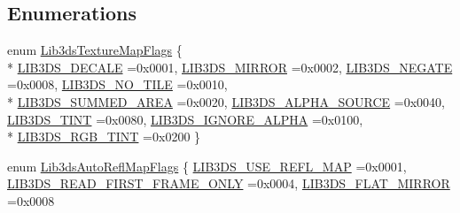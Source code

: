 \subsection*{Enumerations}
\begin{DoxyCompactItemize}
\item 
enum \hyperlink{group__material_ga2ae5527c7d5eab53e2cd3e1357021f96}{Lib3ds\-Texture\-Map\-Flags} \{ \\*
\hyperlink{group__material_gga2ae5527c7d5eab53e2cd3e1357021f96a34a68a6bc340962a8e37c5f0b6e3a678}{L\-I\-B3\-D\-S\-\_\-\-D\-E\-C\-A\-L\-E} =0x0001, 
\hyperlink{group__material_gga2ae5527c7d5eab53e2cd3e1357021f96a95634a83e61bac859c041b52d1adcd5f}{L\-I\-B3\-D\-S\-\_\-\-M\-I\-R\-R\-O\-R} =0x0002, 
\hyperlink{group__material_gga2ae5527c7d5eab53e2cd3e1357021f96a02d890c573757bef78e51058e8e54600}{L\-I\-B3\-D\-S\-\_\-\-N\-E\-G\-A\-T\-E} =0x0008, 
\hyperlink{group__material_gga2ae5527c7d5eab53e2cd3e1357021f96a0b6e8e950541f25cd3f195e963c7b3fe}{L\-I\-B3\-D\-S\-\_\-\-N\-O\-\_\-\-T\-I\-L\-E} =0x0010, 
\\*
\hyperlink{group__material_gga2ae5527c7d5eab53e2cd3e1357021f96a6e968f83117a98e10efeeaad12b14ff1}{L\-I\-B3\-D\-S\-\_\-\-S\-U\-M\-M\-E\-D\-\_\-\-A\-R\-E\-A} =0x0020, 
\hyperlink{group__material_gga2ae5527c7d5eab53e2cd3e1357021f96a4f809440c0d4ee1de9fa93e29b5348cd}{L\-I\-B3\-D\-S\-\_\-\-A\-L\-P\-H\-A\-\_\-\-S\-O\-U\-R\-C\-E} =0x0040, 
\hyperlink{group__material_gga2ae5527c7d5eab53e2cd3e1357021f96aa657a2791df990a618a1c68f5ea1726b}{L\-I\-B3\-D\-S\-\_\-\-T\-I\-N\-T} =0x0080, 
\hyperlink{group__material_gga2ae5527c7d5eab53e2cd3e1357021f96acbfba2d6a91f159cd18620112917ede6}{L\-I\-B3\-D\-S\-\_\-\-I\-G\-N\-O\-R\-E\-\_\-\-A\-L\-P\-H\-A} =0x0100, 
\\*
\hyperlink{group__material_gga2ae5527c7d5eab53e2cd3e1357021f96a4bee1a889bca2c625820fa29e45674f1}{L\-I\-B3\-D\-S\-\_\-\-R\-G\-B\-\_\-\-T\-I\-N\-T} =0x0200
 \}
\item 
enum \hyperlink{group__material_ga27e0cbd4c9ed8324d7ec096c22cf5403}{Lib3ds\-Auto\-Refl\-Map\-Flags} \{ \hyperlink{group__material_gga27e0cbd4c9ed8324d7ec096c22cf5403a51818de777ffe5dd2612b22780a6e6bd}{L\-I\-B3\-D\-S\-\_\-\-U\-S\-E\-\_\-\-R\-E\-F\-L\-\_\-\-M\-A\-P} =0x0001, 
\hyperlink{group__material_gga27e0cbd4c9ed8324d7ec096c22cf5403a91f2d5d245a188f37fc3a13c3cb9a42b}{L\-I\-B3\-D\-S\-\_\-\-R\-E\-A\-D\-\_\-\-F\-I\-R\-S\-T\-\_\-\-F\-R\-A\-M\-E\-\_\-\-O\-N\-L\-Y} =0x0004, 
\hyperlink{group__material_gga27e0cbd4c9ed8324d7ec096c22cf5403a77e9a1673c3d7fa6c478b90705f44188}{L\-I\-B3\-D\-S\-\_\-\-F\-L\-A\-T\-\_\-\-M\-I\-R\-R\-O\-R} =0x0008

\end{DoxyCompactItemize}
